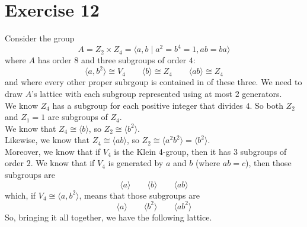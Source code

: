 \documentclass[12pt]{article}
\begin{document}
    \section*{Exercise 12}
    Consider the group 
    \[A = Z_2 \times Z_4 = \langle a, b \mid a^2 = b^4 = 1, ab = ba \rangle\]
    where $A$ has order $8$ and three subgroups of order $4$:
    \[\langle a, b^2 \rangle \cong V_4 
    \qquad \langle b \rangle \cong Z_4
    \qquad \langle ab \rangle \cong Z_4 \]
    and where every other proper subrgoup is contained in of these three.
    We need to draw $A$'s lattice 
    with each subgroup represented using at most $2$ generators. \\
    We know $Z_4$ has a subgroup for each positive integer that divides $4$.
    So both $Z_2$ and $Z_1 = {1}$ are subgroups of $Z_4$. \\
    We know that $Z_4 \cong \langle b \rangle$,
    so $Z_2 \cong \langle b^2 \rangle$. \\ 
    Likewise, we know that $Z_4 \cong \langle ab \rangle$,
    so $Z_2 \cong \langle a^2b^2 \rangle = \langle b^2 \rangle$. \\ 
    Moreover, we know that if $V_4$ is the Klein 4-group,
    then it has $3$ subgroups of order $2$.
    We know that if $V_4$ is generated by $a$ and $b$
    (where $ab = c$),
    then those subgroups are
    \[ \langle a \rangle
    \qquad \langle b \rangle 
    \qquad \langle ab \rangle \]
    which, if $V_4 \cong \langle a, b^2 \rangle$,
    means that those subgroups are
    \[ \langle a \rangle
    \qquad \langle b^2 \rangle 
    \qquad \langle ab^2 \rangle \]
    So, bringing it all together,
    we have the following lattice.
\end{document}
